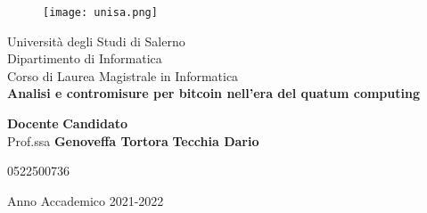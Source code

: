 \begin{titlepage}
  \begin{center}
    \begin{figure}
        \texttt{[image: unisa.png]}
        \centering
      \end{figure}
    {\Large Università degli Studi di Salerno}\\[0.2truecm]
    {\large Dipartimento di Informatica}\\
    \hrulefill
    \vfill
    {\large Corso di Laurea Magistrale in Informatica}\\[0.2truecm]
    \vfill\vfill
    {\LARGE
      {\bf 
        Analisi e contromisure per bitcoin nell'era del quatum computing
      }
    }
    
    \vfill\vfill
    
    
    {\bf Docente} \hfill {\bf Candidato} \\
    Prof.ssa \textbf{Genoveffa Tortora} \hfill  \textbf{Tecchia Dario}
    \centerline{\hfill 0522500736}
    
    
    \vfill
    \hrulefill 
    \begin{center} Anno Accademico 2021-2022 \end{center}
    
  \end{center}
\end{titlepage}
  
\setcounter{page}{1} 		
